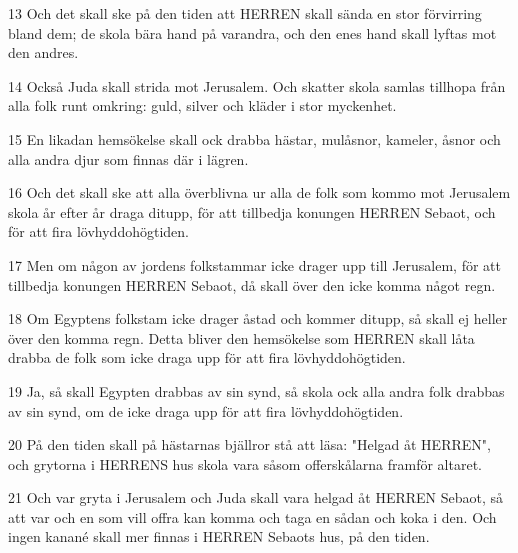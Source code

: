 \par 13 Och det skall ske på den tiden att HERREN skall sända en stor förvirring bland dem; de skola bära hand på varandra, och den enes hand skall lyftas mot den andres.
\par 14 Också Juda skall strida mot Jerusalem. Och skatter skola samlas tillhopa från alla folk runt omkring: guld, silver och kläder i stor myckenhet.
\par 15 En likadan hemsökelse skall ock drabba hästar, mulåsnor, kameler, åsnor och alla andra djur som finnas där i lägren.
\par 16 Och det skall ske att alla överblivna ur alla de folk som kommo mot Jerusalem skola år efter år draga ditupp, för att tillbedja konungen HERREN Sebaot, och för att fira lövhyddohögtiden.
\par 17 Men om någon av jordens folkstammar icke drager upp till Jerusalem, för att tillbedja konungen HERREN Sebaot, då skall över den icke komma något regn.
\par 18 Om Egyptens folkstam icke drager åstad och kommer ditupp, så skall ej heller över den komma regn. Detta bliver den hemsökelse som HERREN skall låta drabba de folk som icke draga upp för att fira lövhyddohögtiden.
\par 19 Ja, så skall Egypten drabbas av sin synd, så skola ock alla andra folk drabbas av sin synd, om de icke draga upp för att fira lövhyddohögtiden.
\par 20 På den tiden skall på hästarnas bjällror stå att läsa: "Helgad åt HERREN", och grytorna i HERRENS hus skola vara såsom offerskålarna framför altaret.
\par 21 Och var gryta i Jerusalem och Juda skall vara helgad åt HERREN Sebaot, så att var och en som vill offra kan komma och taga en sådan och koka i den. Och ingen kanané skall mer finnas i HERREN Sebaots hus, på den tiden.


